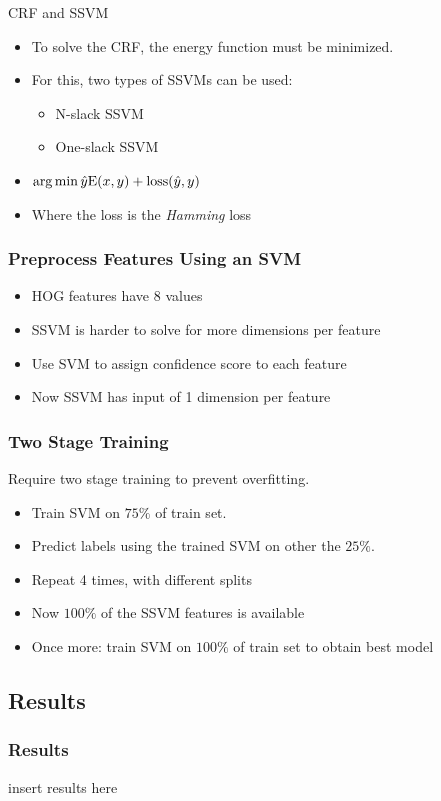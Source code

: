 \begin{frame}{CRF and SSVM}

\begin{itemize}
\item To solve the CRF, the energy function must be minimized.
\item For this, two types of SSVMs can be used:
\begin{itemize}
	\item N-slack SSVM
	\item One-slack SSVM
\end{itemize}
\item $\operatorname*{arg\,min} \hat{y} \text{E}(x, y) + \text{loss}(\hat{y}, y) $
\item Where the loss is the \emph{Hamming} loss
\end{itemize}
\end{frame}

\begin{frame}
\frametitle{Preprocess Features Using an SVM}
\begin{itemize}
\item HOG features have 8 values
\item SSVM is harder to solve for more dimensions per feature
\item Use SVM to assign confidence score to each feature
\item Now SSVM has input of 1 dimension per feature
\end{itemize}
\end{frame}

\begin{frame}
\frametitle{Two Stage Training}
Require two stage training to prevent overfitting.
\begin{itemize}
\item Train SVM on $75\%$ of train set.
\item Predict labels using the trained SVM on other the $25\%$.
\item Repeat 4 times, with different splits
\item Now $100\%$ of the SSVM features is available
\item Once more: train SVM on $100\%$ of train set to obtain best model
\end{itemize}
\end{frame}

\subsection{Results}

\begin{frame}
\frametitle{Results}
insert results here
\end{frame}
